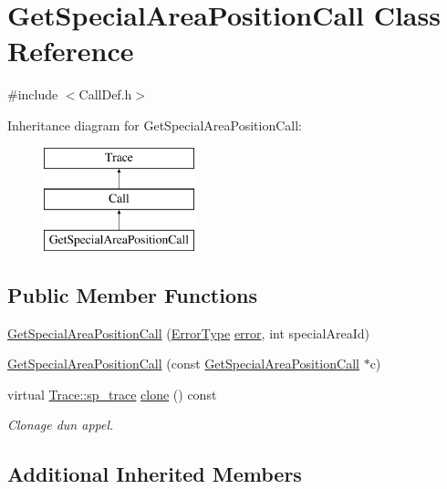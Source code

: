 \hypertarget{class_get_special_area_position_call}{}\section{Get\+Special\+Area\+Position\+Call Class Reference}
\label{class_get_special_area_position_call}


{\ttfamily \#include $<$Call\+Def.\+h$>$}

Inheritance diagram for Get\+Special\+Area\+Position\+Call\+:\begin{figure}[H]
\begin{center}
\leavevmode
\includegraphics[height=3.000000cm]{class_get_special_area_position_call}
\end{center}
\end{figure}
\subsection*{Public Member Functions}
\begin{DoxyCompactItemize}
\item 
\hyperlink{class_get_special_area_position_call_a518d1a74534bb215e79efb6b946deb6e}{Get\+Special\+Area\+Position\+Call} (\hyperlink{class_call_ade833a08ce215aaa4121102f3448c898}{Error\+Type} \hyperlink{class_call_a206f6150a8038fda48c17c2c7421aed1}{error}, int special\+Area\+Id)
\item 
\hyperlink{class_get_special_area_position_call_a8ee59a88084c9bd9d3db3481d61cd307}{Get\+Special\+Area\+Position\+Call} (const \hyperlink{class_get_special_area_position_call}{Get\+Special\+Area\+Position\+Call} $\ast$c)
\item 
virtual \hyperlink{class_trace_a9c58e523529fc8a03fb6acf3eef86150}{Trace\+::sp\+\_\+trace} \hyperlink{class_get_special_area_position_call_ad522313dad00572f50f2a4a84e12dafd}{clone} () const 
\begin{DoxyCompactList}\small\item\em Clonage d\textquotesingle{}un appel. \end{DoxyCompactList}\end{DoxyCompactItemize}
\subsection*{Additional Inherited Members}


